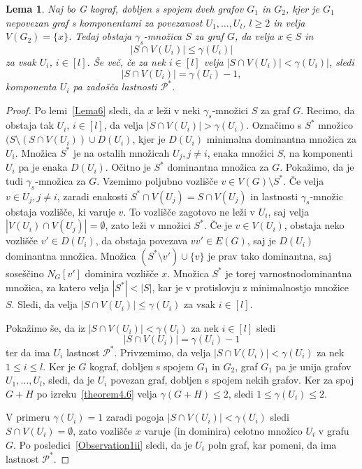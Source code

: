 \documentclass[12pt,a4paper,twoside]{article}
\theoremstyle{definition} %
\theoremstyle{plain} %
\newtheorem{lema}[definicija]{Lema}
\numberwithin{equation}{section}  %
\begin{document}
\begin{lema}\label{Lema7}Naj bo G kograf, dobljen s spojem dveh grafov $G_1$ in $G_2$, kjer je $G_1$ nepovezan graf s komponentami za povezanost $U_1, \dots, U_l$, $l \geq 2$ in velja $V(G_2)=\{x\}$.  Tedaj obstaja $\gamma_s$-množica $S$ za graf $G$, da velja $x \in S$ in $$|S \cap V(U_i)| \leq \gamma(U_i)|$$ za vsak $U_i$, $i \in [l]$. Še več, če za nek  $i \in [l]$ velja $|S \cap V(U_i)| < \gamma(U_i)|$, sledi $$|S \cap V(U_i)| = \gamma(U_i) - 1,$$ komponenta $U_i$ pa zadošča lastnosti $\mathcal{P^*}$. 
\end{lema}

\begin{proof}
Po lemi~\ref{Lema6} sledi, da $x$ leži v neki $\gamma_s$-množici $S$ za graf $G$. Recimo, da obstaja tak $U_i$, $i \in [l]$, da velja $|S \cap V(U_i)| > \gamma(U_i)$. Označimo s $S^*$ množico $(S \setminus (S \cap V(U_i)) \cup D(U_i)$, kjer je $D(U_i)$ minimalna dominantna množica za $U_i$. Množica $S^*$ je na ostalih množicah $U_j, j\neq i$, enaka množici $S$, na komponenti $U_i$ pa je enaka $D(U_i)$. Očitno je  $S^*$ dominantna množica za $G$. Pokažimo, da je tudi $\gamma_s$-množica za $G$.
Vzemimo poljubno vozlišče $v \in V(G) \setminus  S^*$. Če velja $v \in U_j, j\neq i$, zaradi enakosti $S^* \cap V(U_j) = S \cap V(U_j)$  in lastnosti $\gamma_s$-množic obstaja vozlišče, ki varuje $v$. To vozlišče zagotovo ne leži v $U_i$, saj velja $|V(U_i) \cap V(U_j)| = \emptyset$, zato leži v množici $S^*$. Če je $v \in V(U_i)$, obstaja neko vozlišče $v' \in D(U_i)$, da obstaja povezava $vv' \in E(G)$, saj je $D(U_i)$ dominantna množica. Množica $(S^* \setminus v') \cup \{v\}$ je prav tako dominantna, saj soseščino $N_G[v']$ dominira vozlišče $x$. Množica $S^*$ je torej varnostnodominantna množica, za katero velja $|S^*| < |S|$, kar je v protislovju z minimalnostjo množice $S$. Sledi, da velja $|S \cap V(U_i)| \leq \gamma(U_i)$ za vsak $i \in [l]$.

\medskip
Pokažimo še, da iz $|S \cap V(U_i)| < \gamma(U_i)$ za nek $i \in [l]$ sledi $$|S \cap V(U_i)| = \gamma(U_i) - 1$$ ter da ima $U_i$ lastnost $\mathcal{P^*}$. Privzemimo, da velja $|S \cap V(U_i)| < \gamma(U_i)$ za nek $1 \leq i \leq l$. Ker je $G$ kograf, dobljen s spojem $G_1$ in $G_2$, graf $G_1$ pa je unija grafov $U_1, \dots, U_l$, sledi, da je $U_i$ povezan graf, dobljen s spojem nekih grafov. Ker za spoj $G + H$ po izreku~\ref{theorem4.6} velja $\gamma(G+H)\leq 2$, sledi $1 \leq \gamma(U_i) \leq 2$.

V primeru $\gamma(U_i) = 1$ zaradi pogoja $|S \cap V(U_i)| < \gamma(U_i)$ sledi $S \cap V(U_i) = \emptyset$, zato vozlišče $x$ varuje (in dominira) celotno množico $U_i$ v grafu $G$. Po posledici~\ref{Observation1ii} sledi, da je $U_i$ poln graf, kar pomeni, da ima lastnost $\mathcal{P^*}$.


\end{proof}
\end{document}
